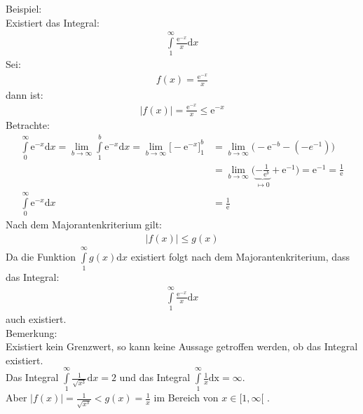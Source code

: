 Beispiel:\\
Existiert das Integral:\\
\begin{align*}
\int\limits_{1}^{\infty}\frac{\mathrm{e}^{-x}}{x} \mathrm{d}x
\end{align*}
Sei:\\
\begin{align*}
f(x)=\frac{\mathrm{e}^{-x}}{x}
\end{align*}
dann ist:\\
\begin{align*}
\lvert f(x)\lvert=\frac{\mathrm{e}^{-x}}{x}\leq \mathrm{e}^{-x}
\end{align*}
Betrachte:\\
\begin{align*}
\int\limits_{0}^{\infty} \mathrm{e}^{-x}\mathrm{d}x=\lim\limits_ {b\to\infty}\int\limits_{1}^{b} \mathrm{e}^{-x}\mathrm{d}x=\lim\limits_ {b\to\infty}\bigg[-\mathrm{e}^{-x}\bigg]^b_1&=\lim\limits_ {b\to\infty}\bigg(-\mathrm{e}^{-b}-(-e^{-1})\bigg)\\
&=\lim\limits_ {b\to\infty}\bigg(\underbrace {-\frac{1}{\mathrm{e}^b}}_{\mapsto 0}+\mathrm{e}^{-1}\bigg)=\mathrm{e}^{-1}=\frac{1}{\mathrm{e}}\\
\int\limits_{0}^{\infty} \mathrm{e}^{-x}\mathrm{d}x&=\frac{1}{\mathrm{e}}
\end{align*}
Nach dem Majorantenkriterium gilt:\\
\begin{align*}
\lvert f(x)\lvert\leq g(x) 
\end{align*}
Da die Funktion $ \int\limits_{1}^{\infty} g(x)\mathrm{d}x $ existiert folgt nach dem Majorantenkriterium, dass das Integral:\\
\begin{align*}
\int\limits_{1}^{\infty}\frac{\mathrm{e}^{-x}}{x} \mathrm{d}x
\end{align*}
auch existiert.\\
Bemerkung:\\
Existiert kein Grenzwert, so kann keine Aussage getroffen werden, ob das Integral existiert.\\
Das Integral $ \int\limits_{1}^{\infty}\frac{1}{\sqrt{x^3}} \mathrm{d}x=2 $ und das Integral $ \int\limits_{1}^{\infty} \frac{1}{x} \mathrm{dx}=\infty$.\\
Aber $ |f(x)|=\frac{1}{\sqrt{x^3}}<g(x)=\frac{1}{x} $ im Bereich von $ x\in   [1,\infty[ $ .
